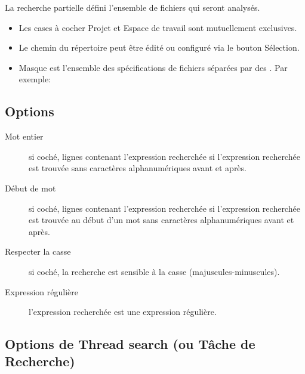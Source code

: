 
La recherche partielle défini l'ensemble de fichiers qui seront analysés.

\begin{itemize}
\item Les cases à cocher Projet et Espace de travail sont mutuellement exclusives.
\item Le chemin du répertoire peut être édité ou configuré via le bouton Sélection.
\item Masque est l'ensemble des spécifications de fichiers séparées par des \samp{;}. Par exemple: 
\end{itemize}

\subsection{Options}

\begin{description}
\item[Mot entier] si coché, lignes contenant l'expression recherchée si l'expression recherchée est trouvée sans caractères alphanumériques  avant et après.
\item[Début de mot] si coché, lignes contenant l'expression recherchée si l'expression recherchée est trouvée au début d'un mot sans caractères alphanumériques  avant et après.
\item[Respecter la casse] si coché, la recherche est sensible à la casse (majuscules-minuscules).
\item[Expression régulière] l'expression recherchée est une expression régulière.
\end{description}


\subsection{Options de Thread search (ou Tâche de Recherche)}

